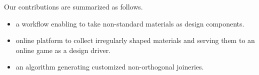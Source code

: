

Our contributions are summarized as follows.
\begin{itemize}
 \item{a workflow enabling to take non-standard materials as design components.}
 \item{online platform to collect irregularly shaped materials and serving them to an online game as a design driver.}
 \item{an algorithm generating customized non-orthogonal joineries.}
\end{itemize}




